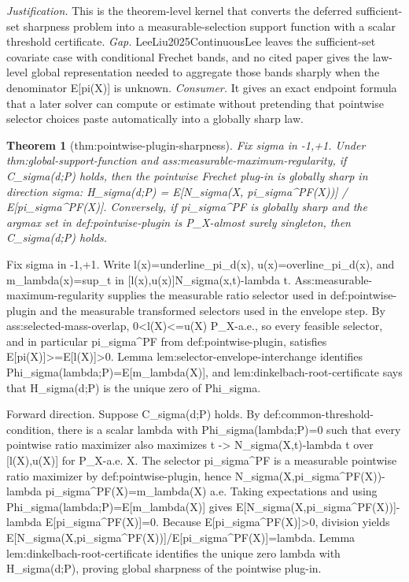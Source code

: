 \documentclass{article}
\newtheorem{theorem}{Theorem}
\begin{document}
\par\smallskip\noindent \textit{Justification.} This is the theorem-level kernel that converts the deferred sufficient-set sharpness problem into a measurable-selection support function with a scalar threshold certificate. \textit{Gap.} LeeLiu2025ContinuousLee leaves the sufficient-set covariate case with conditional Frechet bands, and no cited paper gives the law-level global representation needed to aggregate those bands sharply when the denominator E[pi(X)] is unknown. \textit{Consumer.} It gives an exact endpoint formula that a later solver can compute or estimate without pretending that pointwise selector choices paste automatically into a globally sharp law.

\begin{theorem}[thm:pointwise-plugin-sharpness]\label{thm:pointwise-plugin-sharpness}
Fix sigma in {-1,+1}. Under thm:global-support-function and ass:measurable-maximum-regularity, if C_sigma(d;P) holds, then the pointwise Frechet plug-in is globally sharp in direction sigma: H_sigma(d;P) = E[N_sigma(X, pi_sigma^PF(X))] / E[pi_sigma^PF(X)]. Conversely, if pi_sigma^PF is globally sharp and the argmax set in def:pointwise-plugin is P_X-almost surely singleton, then C_sigma(d;P) holds.
\end{theorem}
Fix sigma in {-1,+1}. Write l(x)=underline_pi_d(x), u(x)=overline_pi_d(x), and m_lambda(x)=sup_{t in [l(x),u(x)]}{N_sigma(x,t)-lambda t}. Ass:measurable-maximum-regularity supplies the measurable ratio selector used in def:pointwise-plugin and the measurable transformed selectors used in the envelope step. By ass:selected-mass-overlap, 0<l(X)<=u(X) P_X-a.e., so every feasible selector, and in particular pi_sigma^PF from def:pointwise-plugin, satisfies E[pi(X)]>=E[l(X)]>0. Lemma lem:selector-envelope-interchange identifies Phi_sigma(lambda;P)=E[m_lambda(X)], and lem:dinkelbach-root-certificate says that H_sigma(d;P) is the unique zero of Phi_sigma.

Forward direction. Suppose C_sigma(d;P) holds. By def:common-threshold-condition, there is a scalar lambda with Phi_sigma(lambda;P)=0 such that every pointwise ratio maximizer also maximizes t -> N_sigma(X,t)-lambda t over [l(X),u(X)] for P_X-a.e. X. The selector pi_sigma^PF is a measurable pointwise ratio maximizer by def:pointwise-plugin, hence N_sigma(X,pi_sigma^PF(X))-lambda pi_sigma^PF(X)=m_lambda(X) a.e. Taking expectations and using Phi_sigma(lambda;P)=E[m_lambda(X)] gives E[N_sigma(X,pi_sigma^PF(X))]-lambda E[pi_sigma^PF(X)]=0. Because E[pi_sigma^PF(X)]>0, division yields E[N_sigma(X,pi_sigma^PF(X))]/E[pi_sigma^PF(X)]=lambda. Lemma lem:dinkelbach-root-certificate identifies the unique zero lambda with H_sigma(d;P), proving global sharpness of the pointwise plug-in.
\end{document}
